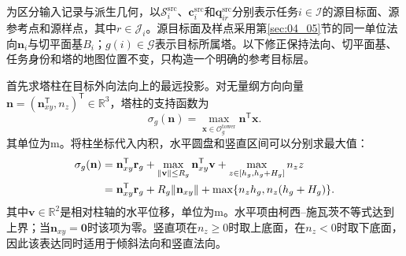 为区分输入记录与派生几何，以$\mathcal S_i^{\mathrm{src}}$、$\mathbf c_i^{\mathrm{src}}$和$\mathbf q_{ir}^{\mathrm{src}}$分别表示任务$i\in\mathcal I$的源目标面、源参考点和源样点，其中$r\in\mathcal J_i$。源目标面及样点采用第\ref{sec:04_05}节的同一单位法向$\mathbf n_i$与切平面基$B_i$；$g(i)\in\mathcal G$表示目标所属塔。以下修正保持法向、切平面基、任务身份和塔的地图位置不变，只构造一个明确的参考目标层。

首先求塔柱在目标外向法向上的最远投影。对无量纲方向向量$\mathbf n=(\mathbf n_{xy}^{\mathsf T},n_z)^{\mathsf T}\in\mathbb R^3$，塔柱的支持函数为
\begin{equation}
 \sigma_g(\mathbf n)
 =\max_{\mathbf x\in\mathcal O_g^{\mathrm{tower}}}
       \mathbf n^{\mathsf T}\mathbf x.
 \label{s0406:tower_support_definition}
\end{equation}
其单位为$\mathrm m$。将柱坐标代入内积，水平圆盘和竖直区间可以分别求最大值：
\begin{align}
 \sigma_g(\mathbf n)
 ={}&\mathbf n_{xy}^{\mathsf T}\mathbf r_g
 +\max_{\|\mathbf v\|\le R_g}\mathbf n_{xy}^{\mathsf T}\mathbf v
 +\max_{z\in[h_g,h_g+H_g]}n_z z\notag\\
 ={}&\mathbf n_{xy}^{\mathsf T}\mathbf r_g
 +R_g\|\mathbf n_{xy}\|
 +\max\{n_z h_g,n_z(h_g+H_g)\}.
 \label{s0406:tower_support_formula}
\end{align}
其中$\mathbf v\in\mathbb R^2$是相对柱轴的水平位移，单位为$\mathrm m$。水平项由柯西--施瓦茨不等式达到上界；当$\mathbf n_{xy}=\mathbf0$时该项为零。竖直项在$n_z\ge0$时取上底面，在$n_z<0$时取下底面，因此该表达同时适用于倾斜法向和竖直法向。

